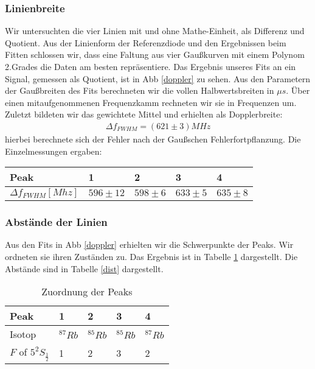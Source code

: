 \documentclass[12pt]{article}
\begin{document}
\subsubsection{Linienbreite}
Wir untersuchten die vier Linien mit und ohne Mathe-Einheit, als Differenz und Quotient. Aus der Linienform der Referenzdiode und den Ergebnissen beim Fitten schlossen wir, dass eine Faltung aus vier Gaußkurven mit einem Polynom 2.Grades die Daten am besten repräsentiere. Das Ergebnis unseres Fits an ein Signal, gemessen als Quotient, ist in Abb \ref{doppler} zu sehen. Aus den Parametern der Gaußbreiten des Fits berechneten wir die vollen Halbwertsbreiten in $\mu s$. Über einen mitaufgenommenen Frequenzkamm rechneten wir sie in Frequenzen um. Zuletzt bildeten wir das gewichtete Mittel und erhielten als Dopplerbreite:
\begin{align*}
 \Delta f_{FWHM} = (621 \pm 3) MHz
\end{align*}
hierbei berechnete sich der Fehler nach der Gaußschen Fehlerfortpflanzung. Die Einzelmessungen ergaben:
\begin{center}
\begin{tabular}{|l|l|l|l|l|}
\hline
Peak & 1 & 2 & 3 & 4\\
\hline
$\Delta f_{FWHM} [Mhz]$ & $596\pm12$ & $598 \pm 6$ & $633 \pm 5$ & $635 \pm 8$\\
\hline
\end{tabular}
\end{center}
\subsubsection{Abstände der Linien}
Aus den Fits in Abb \ref{doppler} erhielten wir die Schwerpunkte der Peaks. Wir ordneten sie ihren Zuständen zu. Das Ergebnis ist in Tabelle \ref{order} dargestellt. Die Abstände sind in Tabelle \ref{dist} dargestellt.

\begin{table}[H]
\begin{center}
\begin{tabular}{|l|l|l|l|l|}
\hline 
Peak & 1 & 2 & 3 & 4\\
\hline
Isotop & $^{87}Rb$ & $^{85}Rb$ & $^{85}Rb$ & $^{87}Rb$\\
$F$ of $5^2S_{\frac{1}{2}}$ & 1 & 2 & 3 & 2 \\
\hline
\end{tabular}
\end{center}
\caption{Zuordnung der Peaks}
\label{order}
\end{table}
\end{document}
